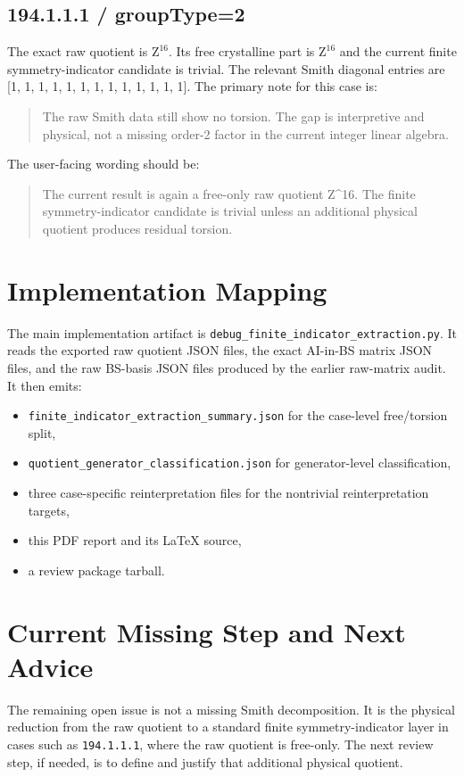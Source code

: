 \documentclass[11pt]{article}
\begin{document}
\subsection*{194.1.1.1 / groupType=2}
The exact raw quotient is $\mathrm{Z}^{16}$.
Its free crystalline part is $\mathrm{Z}^{16}$ and the current finite symmetry-indicator candidate is $\mathrm{trivial}$.
The relevant Smith diagonal entries are [1, 1, 1, 1, 1, 1, 1, 1, 1, 1, 1, 1, 1].
The primary note for this case is:
\begin{quote}
The raw Smith data still show no torsion. The gap is interpretive and physical, not a missing order-2 factor in the current integer linear algebra.
\end{quote}
The user-facing wording should be:
\begin{quote}
The current result is again a free-only raw quotient Z\textasciicircum{}16. The finite symmetry-indicator candidate is trivial unless an additional physical quotient produces residual torsion.
\end{quote}

        \section{Implementation Mapping}
        The main implementation artifact is \texttt{debug\_finite\_indicator\_extraction.py}.
        It reads the exported raw quotient JSON files, the exact AI-in-BS matrix JSON files,
        and the raw BS-basis JSON files produced by the earlier raw-matrix audit.
        It then emits:
        \begin{itemize}
        \item \texttt{finite\_indicator\_extraction\_summary.json} for the case-level free/torsion split,
        \item \texttt{quotient\_generator\_classification.json} for generator-level classification,
        \item three case-specific reinterpretation files for the nontrivial reinterpretation targets,
        \item this PDF report and its \LaTeX{} source,
        \item a review package tarball.
        \end{itemize}

        \section{Current Missing Step and Next Advice}
        The remaining open issue is not a missing Smith decomposition.  It is the physical reduction from the raw quotient to a standard finite symmetry-indicator layer in cases such as \texttt{194.1.1.1}, where the raw quotient is free-only.  The next review step, if needed, is to define and justify that additional physical quotient.

        
\end{document}
